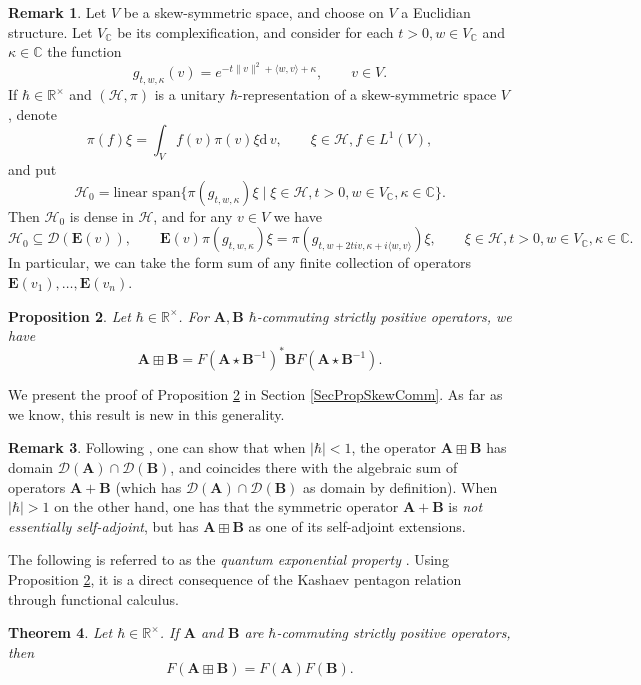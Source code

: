 \documentclass[11pt, reqno]{amsart}
\newtheorem{theorem}{Theorem}[section]
\newtheorem{prop}[theorem]{Proposition}
\theoremstyle{definition}
\newtheorem{remark}[theorem]{Remark}
\numberwithin{equation}{section}
\def\C{\mathbb C}
\def\msD{\mathscr D}
\def\R{\mathbb R}
\newcommand{\Hsp}{\mathcal{H}}
\newcommand{\eb}{\mathbf{E}}
\newcommand{\rd}{\mathrm{d}\!\,}
\newcommand{\Ab}{\mathbf{A}}
\newcommand{\Bb}{\mathbf{B}}
\begin{document}
\begin{remark}\label{RemFormSumFinite}
Let $V$ be a  skew-symmetric space, and choose on $V$ a Euclidian structure. Let $V_{\C}$ be its complexification, and consider for each $t>0,w\in V_{\C}$ and $\kappa \in \C$ the function 
\[
g_{t,w,\kappa}(v) = e^{-t\|v\|^2 +\langle w,v\rangle + \kappa},\qquad v\in V. 
\]
If $\hbar\in\R^{\times}$ and $(\Hsp,\pi)$ is a unitary $\hbar$-representation of a skew-symmetric space $V$, denote 
\[
 \pi(f)\xi = \int_{V} f(v) \pi(v) \xi \rd v,\qquad \xi \in \Hsp,f\in L^1(V),
\]
and put
\[
\Hsp_0 = \textrm{linear span}\{\pi(g_{t,w,\kappa})\xi\mid \xi \in \Hsp,t>0,w\in V_{\C},\kappa \in \C\}.
\]
Then $\Hsp_0$ is dense in $\Hsp$, and for any $v\in V$ we have 
\[
\Hsp_0  \subseteq \msD(\eb(v)),\qquad \eb(v)\pi(g_{t,w,\kappa})\xi = \pi(g_{t,w+2tiv,\kappa+i\langle w,v\rangle})\xi,\qquad \xi \in \Hsp,t>0,w\in V_{\C},\kappa \in \C. 
\]
In particular, we can take the form sum of any finite collection of operators $\eb(v_1),\ldots,\eb(v_n)$. 
\end{remark} 

\begin{prop}\label{PropSkewComm}
Let $\hbar\in\R^{\times}$. For $\Ab,\Bb$ $\hbar$-commuting strictly positive operators, we have
\begin{equation}\label{EqBoxPlusDef}
\Ab \boxplus \Bb = F(\Ab\star\Bb^{-1})^*\Bb F(\Ab\star\Bb^{-1}).
\end{equation}
\end{prop}

We present the proof of Proposition \ref{PropSkewComm} in Section \ref{SecPropSkewComm}. As far as we know, this result is new in this generality.

\begin{remark}
Following \cite[Appendix B]{Rui05}, one can show that when $|\hbar|<1$, the operator $\Ab \boxplus \Bb$ has domain $\msD(\Ab)\cap \msD(\Bb)$, and coincides there with the algebraic sum of operators $\Ab+\Bb$ (which has $\msD(\Ab)\cap \msD(\Bb)$ as domain by definition). When $|\hbar|>1$ on the other hand, one has that the symmetric operator $\Ab+\Bb$ is \emph{not essentially self-adjoint}, but has $\Ab\boxplus \Bb$ as one of its self-adjoint extensions.
\end{remark}

The following is referred to as the \emph{quantum exponential property} \cite{Wor00}. Using Proposition \ref{PropSkewComm}, it is a direct consequence of the Kashaev pentagon relation through functional calculus. 
\begin{theorem}\label{TheoExponGen}
Let $\hbar\in \R^{\times}$. If $\Ab$ and $\Bb$ are $\hbar$-commuting strictly positive operators, then 
\begin{equation}\label{EqExpoGenProp}
F(\Ab \boxplus \Bb) = F(\Ab)F(\Bb). 
\end{equation}
\end{theorem} 
\end{document}
